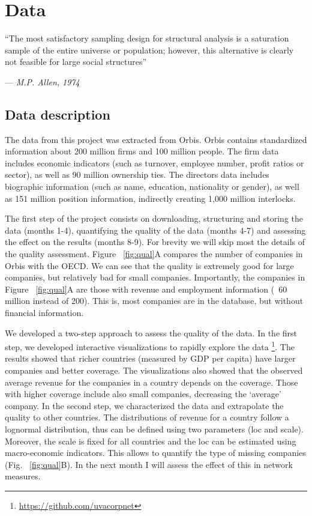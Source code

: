 \section{Data}
\label{sec:data}
``The most satisfactory sampling design for structural analysis is a saturation sample of the entire universe or population; 
however, this alternative is clearly not feasible for large social structures'' 

\begin{flushright}
--- \textit{M.P. Allen, 1974}~\cite{Allen1974}
\end{flushright}

\subsection{Data description}
The data from this project was extracted from Orbis.
Orbis contains standardized information about 200 million firms and 100 million people. 
The firm data includes economic indicators (such as turnover, employee number, profit ratios or sector),
as well as 90 million ownership ties.
The directors data includes biographic information (such as name, education, nationality or gender), 
as well as 151 million position information,
indirectly creating 1,000 million interlocks.

The first step of the project consists on downloading, structuring and storing the data (months 1-4), quantifying the quality of the data (months 4-7) and assessing the effect on the results (months 8-9). For brevity we will skip most the details of the quality assessment. Figure ~\ref{fig:qual}A compares the number of companies in Orbis with the OECD. We can see that the quality is extremely good for large companies, but relatively bad for small companies. Importantly, the companies in Figure ~\ref{fig:qual}A are those with revenue and employment information (~60 million instead of 200). This is, most companies are in the database, but without financial information. 

We developed a two-step approach to assess the quality of the data. In the first step, we developed interactive visualizations to rapidly explore the data \footnote{\url{https://github.com/uvacorpnet}}. The results showed that richer countries (measured by GDP per capita) have larger companies and better coverage. The visualizations also showed that the observed average revenue for the companies in a country depends on the coverage. Those with higher coverage include also small companies, decreasing the `average' company. In the second step, we characterized the data and extrapolate the quality to other countries. The distributions of revenue for a country follow a lognormal distribution, thus can be defined using two parameters (loc and scale). Moreover, the scale is fixed for all countries and the loc can be estimated using macro-economic indicators. This allows to quantify the type of missing companies (Fig. ~\ref{fig:qual}B). In the next month I will assess the effect of this in network measures.

